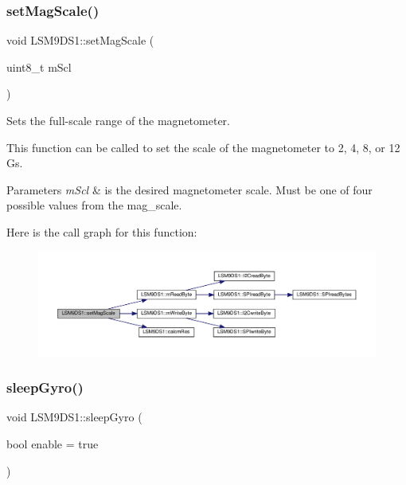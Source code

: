 \subsubsection{\texorpdfstring{set\+Mag\+Scale()}{setMagScale()}}
{\footnotesize\ttfamily void L\+S\+M9\+D\+S1\+::set\+Mag\+Scale (\begin{DoxyParamCaption}\item[{uint8\+\_\+t}]{m\+Scl }\end{DoxyParamCaption})}



Sets the full-\/scale range of the magnetometer. 

This function can be called to set the scale of the magnetometer to 2, 4, 8, or 12 Gs.


\begin{DoxyParams}{Parameters}
{\em m\+Scl} & is the desired magnetometer scale. Must be one of four possible values from the mag\+\_\+scale. \\
\hline
\end{DoxyParams}
Here is the call graph for this function\+:
\nopagebreak
\begin{figure}[H]
\begin{center}
\leavevmode
\includegraphics[width=350pt]{classLSM9DS1_ad7604159a07b0d088cdfb6ba4a0093b0_cgraph}
\end{center}
\end{figure}
\mbox{\label{classLSM9DS1_a13b61812069b399547f177b0b0af8fe3}} 
\subsubsection{\texorpdfstring{sleep\+Gyro()}{sleepGyro()}}
{\footnotesize\ttfamily void L\+S\+M9\+D\+S1\+::sleep\+Gyro (\begin{DoxyParamCaption}\item[{bool}]{enable = {\ttfamily true} }\end{DoxyParamCaption})}



